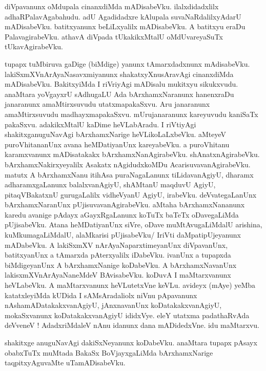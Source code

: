 \documentclass{article}
\begin{document}
\begin{mn}%
diVpavanunx oMdupala cinanxdiMda mADisabeVku. ilalxdidadxlilx adhaRPalavAgabahudu. adU Agadidadxre 
kAlupala suvaNaRdalilxyAdarU mADisabeVku. batitxyanunx beLiLxyalilx mADisabeVku. A batitxyu eraDu 
PalavagirabeVku. athavA diVpada tUkakikxMtalU oMdUvareyaSuTx tUkavAgirabeVku.
\end{mn}

\begin{mn}%
tupapx tuMbiruva gaDige (biMdige) yanunx tAmarxdadxnunx mAdisabeVku. lakiSxmXVnArAyaNasavxmiyanunx 
shakatxyXnusAravAgi cinanxdiMda mADisabeVku. BakitxyiMda I riVriyAgi mADisalu mukitxyu sikukxvudu. 
anaMtara yoVgayxrU sAdhugaLU Ada bArxhamxNaranunx hanenxraDu janaranunx amaMtirxsuvudu 
utatxmapakaSxvu. Aru janaranunx amaMtirxsuvudu madhayxmapakaSxvu. mUrujanaranunx kareyuvudu kaniSaTx
pakaSxvu. adakikxMtalU kaDime heVLabAradu. I riVtiyAgi shakitxganuguNavAgi bArxhamxNarige 
heVLikoLaLxbeVku. aMteyeV puroVhitananUnx avana heMDatiyanUnx kareyabeVku. a puroVhitanu 
karamxvanunx mADisatakakx bArxhamxNanAgirabeVku. shAnatxnAgirabeVku. bArxhamxNakirxyeyalilx 
Asakatx nAgidudxkoMDu AcarisuvavanAgirabeVku. matutx A bArxhamxNanu itihAsa puraNagaLanunx 
tiLidavanAgiyU, dharamx adharamxgaLanunx balalxvanAgiyU, shAMtanU maqduvU AgiyU, pitaqVBakatxnU 
gurugaLalilx vidheVyanU AgiyU, irabeVku. deVvategaLanUnx bArxhamxNaranUnx pUjisuvavanAgirabeVku. 
aMtaha bArxhamxNananunx karedu avanige pAdayx aGayxRgaLanunx koTuTx baTeTx oDavegaLiMda 
pUjisabeVku. Atana heMDatiyanUnx siVre, oDave muMtAvugaLiMdalU arishina, kuMkumagaLiMdalU, 
alaMkarisi pUjisabeVku/ IriVti daMpatipUjeyanunx mADabeVku. A lakiSxmXV nArAyaNaparxtimeyanUnx 
diVpavanUnx, batitxyanUnx a tAmarxda pAterxyalilx iDabeVku. ivanUnx a tupapxda biMdigeyanUnx A 
bArxhamxNanige koDabeVku. A bArxhamxNavanUnx lakisxmXVnArAyaNaneMdeV BAvisabeVku. koDuvA I 
maMtarxvanunx heVLabeVku. A maMtarxvanunx heVLutetxVne keVLu. avideyx (mAye) yeMba katatxleyiMda 
kUDida I sAMsAradaliolx niVnu pApavanunx nAshamADatakakxvanAgiyU, jAnxnavanUnx koDatakakxvanAgiyU, 
mokaSxvanunx koDatakakxvanAgiyU ididxVye. eleY utatxma padathaRvAda deVveneV ! AdadxriMdaleV nAnu 
idanunx dana mADidedxVne. idu maMtarxvu.
\end{mn}

\begin{mn}%
shakitxge anuguNavAgi dakiSxNeyanunx koDabeVku. anaMtara tupapx pAsayx obabxTuTx muMtada BakaSx 
BoVjayxgaLiMda bArxhamxNarige taqpitxyAguvaMte uTamADisabeVku.
\end{mn}
\end{document}
